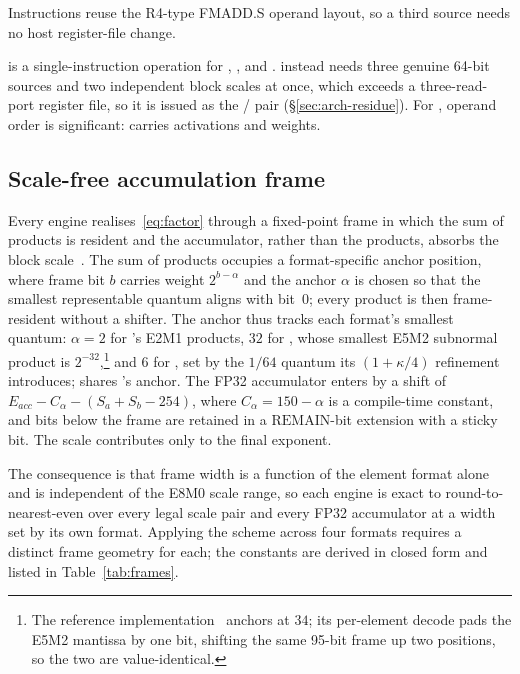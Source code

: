 Instructions reuse the R4-type FMADD.S operand layout, so a third source needs
no host register-file change.



\MXFUSED{} is a single-instruction operation for \fpfour, \fpeight, and \mtwo.
\fpfourres{} instead needs three genuine 64-bit sources and two independent
block scales at once, which exceeds a three-read-port register file, so it is
issued as the \MXDOTP/\MXFINAL{} pair (\S\ref{sec:arch-residue}). For \mtwo{},
operand order is significant:  carries activations and 
weights.

\subsection{Scale-free accumulation frame}
\label{sec:arch-frame}

Every engine realises~\eqref{eq:factor} through a fixed-point frame in which
the sum of products is resident and the accumulator, rather than the products,
absorbs the block scale~\cite{lutz2024fp8dot,islamoglu2025mxdotp}. The sum of
products occupies a format-specific anchor position, where frame bit $b$ carries
weight $2^{b-\alpha}$ and the anchor $\alpha$ is chosen so that the smallest
representable quantum aligns with bit~0; every product is then frame-resident
without a shifter. The anchor thus tracks each format's smallest quantum:
$\alpha=2$ for \fpfour's E2M1 products, $32$ for \fpeight, whose smallest E5M2
subnormal product is $2^{-32}$,\footnote{The reference
implementation~\cite{islamoglu2025mxdotp} anchors at $34$; its per-element decode
pads the E5M2 mantissa by one bit, shifting the same 95-bit frame up two
positions, so the two are value-identical.} and $6$ for \mtwo, set by the $1/64$
quantum its $(1+\kappa/4)$ refinement introduces; \fpfourres{} shares \fpfour's
anchor. The FP32 accumulator enters by a shift of
$E_{\mathit{acc}} - C_\alpha - (S_a{+}S_b{-}254)$, where $C_\alpha = 150-\alpha$
is a compile-time constant, and bits below the frame are retained in a
$\mathrm{REMAIN}$-bit extension with a sticky bit. The scale contributes only to
the final exponent.

The consequence is that frame width is a function of the element format alone
and is independent of the E8M0 scale range, so each engine is exact to
round-to-nearest-even over every legal scale pair and every FP32 accumulator at
a width set by its own format. Applying the scheme across four formats requires
a distinct frame geometry for each; the constants are derived in closed form and
listed in Table~\ref{tab:frames}.

